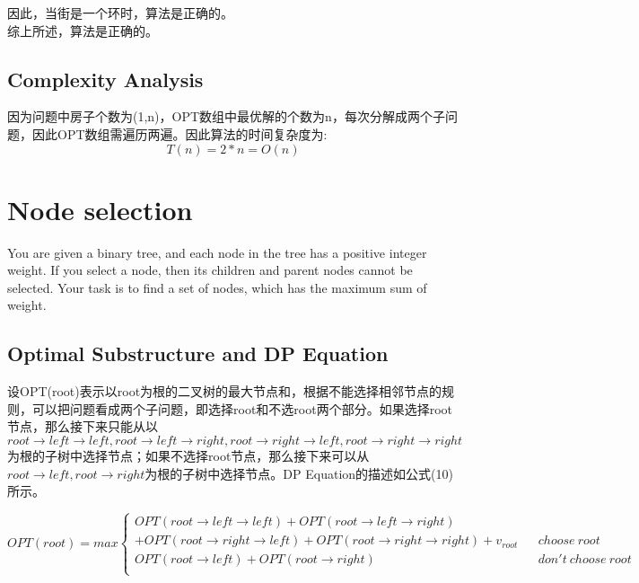 \documentclass{article}
\begin{document}
因此，当街是一个环时，算法是正确的。
\\

综上所述，算法是正确的。


\subsection{Complexity Analysis}

因为问题中房子个数为(1,n)，OPT数组中最优解的个数为n，每次分解成两个子问题，因此OPT数组需遍历两遍。因此算法的时间复杂度为:
\begin{equation}
T(n) = 2*n = O(n)
\end{equation}

\newpage
\section{Node selection}

You are given a binary tree, and each node in the tree has a positive integer weight. If you select a node, then its children and parent nodes cannot be selected. Your task is to find a set of nodes, which has the maximum sum of weight.

\subsection{Optimal Substructure and DP Equation}

设OPT(root)表示以root为根的二叉树的最大节点和，根据不能选择相邻节点的规则，可以把问题看成两个子问题，即选择root和不选root两个部分。如果选择root节点，那么接下来只能从以$root\rightarrow left\rightarrow left,root\rightarrow left \rightarrow right,root\rightarrow right\rightarrow left,root\rightarrow right\rightarrow right$为根的子树中选择节点；如果不选择root节点，那么接下来可以从$root\rightarrow left, root\rightarrow right$为根的子树中选择节点。DP Equation的描述如公式(10)所示。

\begin{equation} 
OPT(root)=max\left\{
\begin{array}{lcr}
OPT(root\rightarrow left\rightarrow left) +OPT(root\rightarrow left \rightarrow right)       &      & \\
+OPT(root\rightarrow right\rightarrow left)+OPT(root\rightarrow right\rightarrow right)+v_{root}   &   &  choose\ root\\
OPT(root\rightarrow left)+OPT(root\rightarrow right)     &      & don't\ choose\ root\\

\end{array} \right.
\end{equation} 
\end{document}

